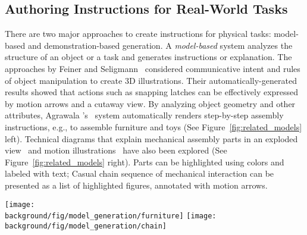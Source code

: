 

\subsection{Authoring Instructions for Real-World Tasks}

There are two major approaches to create instructions for physical tasks: model-based and demonstration-based generation.
%
A \emph{model-based} system analyzes the structure of an object or a task and generates instructions or explanation.
%
The approaches by Feiner and Seligmann~\cite{feiner:1985:AEA:1299975.1300548,Seligmann:1991:AGI:127719.122732} considered communicative intent and rules of object manipulation to create 3D illustrations. Their automatically-generated results showed that actions such as snapping latches can be effectively expressed by motion arrows and a cutaway view.
%
By analyzing object geometry and other attributes, Agrawala \ea{}'s~\cite{agrawala2003designing} system automatically renders step-by-step assembly instructions, e.g., to assemble furniture and toys (See Figure~\ref{fig:related_models} left).
%
Technical diagrams that explain mechanical assembly parts in an exploded view~\cite{li2008automated} and motion illustrations~\cite{mitra2010illustrating} have also been explored (See Figure~\ref{fig:related_models} right). Parts can be highlighted using colors and labeled with text; Casual chain sequence of mechanical interaction can be presented as a list of highlighted figures, annotated with motion arrows.

\begin{figure*}[t!]
  \centering
  \texttt{[image: \\background/fig/model\_generation/furniture]}
  \texttt{[image: \\background/fig/model\_generation/chain]}
  \caption{Examples of instructions automatically generated by Agrawala \ea~\cite{agrawala2003designing} (left) and Mitra \ea~\cite{mitra2010illustrating} (right) using model-based approaches.}
  \label{fig:related_models}
\end{figure*}

